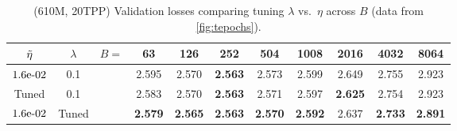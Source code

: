 \begin{table}
  \centering
  \caption{(610M, 20TPP) Validation losses comparing tuning $\lambda$
    vs.\ $\eta$ across $B$ (data from \cref{fig:tepochs}).\label{tab:lr_v_wd}}
\begin{tabular}{@{}ccr@{}cccccccc@{}}
\toprule
$\tilde{\eta}$                      & $\lambda$ & $B$$=$                   & 63         & 126        & 252        & 504        & 1008       & 2016       & 4032       & 8064       \\ \midrule
$1.6\mbox{e-}02$                       & 0.1       &                    & 2.595          & 2.570          & \textbf{2.563} & 2.573          & 2.599          & 2.649          & 2.755          & 2.923          \\
Tuned                          & 0.1       &                    & 2.583          & 2.570          & \textbf{2.563} & 2.571          & 2.597          & \textbf{2.625} & 2.754          & 2.923          \\
$1.6\mbox{e-}02$                       & Tuned     &                    & \textbf{2.579} & \textbf{2.565} & \textbf{2.563} & \textbf{2.570} & \textbf{2.592} & 2.637          & \textbf{2.733} & \textbf{2.891} \\ \bottomrule
\end{tabular}
\end{table}
